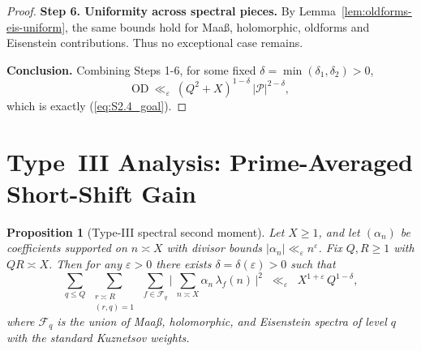 \documentclass[11pt]{article}
\def\eqref#1{(\ref{#1})}%
\newtheorem{proposition}[lemma]{Proposition}
\theoremstyle{definition}
\theoremstyle{remark}
\numberwithin{equation}{part}
\begin{document}
\begin{proof}
	\smallskip
	\textbf{Step 6. Uniformity across spectral pieces.}
	By Lemma~\ref{lem:oldforms-eis-uniform}, the same bounds hold for Maa\ss, holomorphic, oldforms and Eisenstein contributions. Thus no exceptional case remains.

	\smallskip
	\textbf{Conclusion.}
	Combining Steps 1-6, for some fixed $\delta=\min(\delta_1,\delta_2)>0$,
	\[
		\mathrm{OD}\ \ll_\varepsilon\ (Q^2+X)^{1-\delta}\,|\mathcal P|^{2-\delta},
	\]
	which is exactly \eqref{eq:S2.4_goal}.
\end{proof}

\section{Type~III Analysis: Prime-Averaged Short-Shift Gain}

\begin{proposition}[Type-III spectral second moment]\label{prop:typeIII}
	Let $X\ge1$, and let $(\alpha_n)$ be coefficients supported on $n\asymp X$ with divisor bounds $|\alpha_n|\ll_\varepsilon n^\varepsilon$.
	Fix $Q,R\ge1$ with $QR\asymp X$.
	Then for any $\varepsilon>0$ there exists $\delta=\delta(\varepsilon)>0$ such that
	\begin{equation}\label{eq:typeIII-target}
		\sum_{q\le Q}\ \sum_{\substack{r\asymp R \\ (r,q)=1}}\ \sum_{f\in\mathcal F_q}
		\Biggl|\ \sum_{n\asymp X} \alpha_n\,\lambda_f(n)\,\Biggr|^2
		\;\;\ll_{\varepsilon}\;\; X^{1+\varepsilon}\,Q^{1-\delta},
	\end{equation}
	where $\mathcal F_q$ is the union of Maaß, holomorphic, and Eisenstein spectra of level $q$ with the standard Kuznetsov weights.
\end{proposition}
\end{document}
